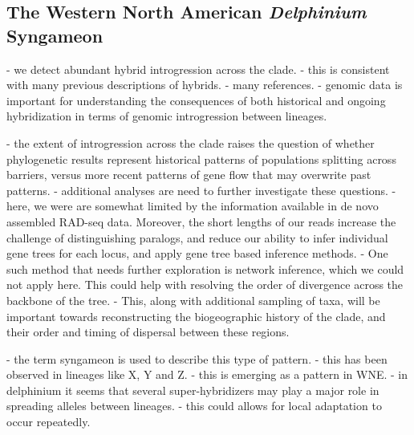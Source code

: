 \documentclass[11pt]{article}
\begin{document}
\subsection{The Western North American \emph{Delphinium} Syngameon}

- we detect abundant hybrid introgression across the clade.
- this is consistent with many previous descriptions of hybrids.
- many references.
- genomic data is important for understanding the consequences of 
  both historical and ongoing hybridization in terms of genomic
  introgression between lineages.


- the extent of introgression across the clade raises the question
  of whether phylogenetic results represent historical patterns of
  populations splitting across barriers, versus more recent patterns
  of gene flow that may overwrite past patterns.
- additional analyses are need to further investigate these questions.
- here, we were are somewhat limited by the information available in
  de novo assembled RAD-seq data. Moreover, the short lengths of our
  reads increase the challenge of distinguishing paralogs, and reduce
  our ability to infer individual gene trees for each locus, and apply
  gene tree based inference methods.
- One such method that needs further exploration is network inference,
  which we could not apply here. This could help with resolving the order
  of divergence across the backbone of the tree.
- This, along with additional sampling of taxa, will be important towards
  reconstructing the biogeographic history of the clade, and their order
  and timing of dispersal between these regions.


- the term syngameon is used to describe this type of pattern.
- this has been observed in lineages like X, Y and Z.
- this is emerging as a pattern in WNE.
- in delphinium it seems that several super-hybridizers may play
  a major role in spreading alleles between lineages.
- this could allows for local adaptation to occur repeatedly.
\end{document}
